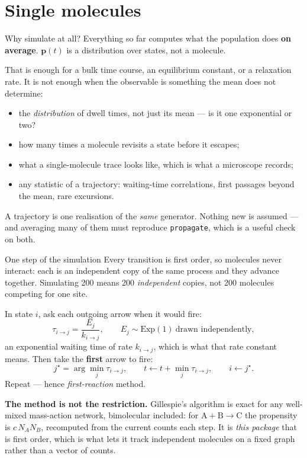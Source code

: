 \documentclass[10pt,aspectratio=169]{beamer}
\newcommand{\code}[1]{\texttt{\small #1}}
\begin{document}
\section[Single molecules]{Single molecules}

\begin{frame}{Why simulate at all?}
  Everything so far computes what the population does \textbf{on average}.
  $\bm{p}(t)$ is a distribution over states, not a molecule.

  That is enough for a bulk time course, an equilibrium constant, or a
  relaxation rate. It is not enough when the observable is something the
  mean does not determine:
  \begin{itemize}
    \item the \emph{distribution} of dwell times, not just its mean --- is
      it one exponential or two?
    \item how many times a molecule revisits a state before it escapes;
    \item what a single-molecule trace looks like, which is what a
      microscope records;
    \item any statistic of a trajectory: waiting-time correlations, first
      passages beyond the mean, rare excursions.
  \end{itemize}
  A trajectory is one realisation of the \emph{same} generator. Nothing new
  is assumed --- and averaging many of them must reproduce
  \code{propagate}, which is a useful check on both.
\end{frame}

\begin{frame}{One step of the simulation}
  Every transition is first order, so molecules never interact: each is an
  independent copy of the same process and they advance together. Simulating 200 means 200 \emph{independent} copies, not
  200 molecules competing for one site.

  In state $i$, ask each outgoing arrow when it would fire:
  \vspace{-0.3em}
  \[
    \tau_{i\to j} = \frac{E_j}{k_{i\to j}},
    \qquad E_j \sim \mathrm{Exp}(1)\ \text{drawn independently},
  \]
  an exponential waiting time of rate $k_{i\to j}$, which is what that
  rate constant means. Then take the \textbf{first} arrow to fire:
  \[
    j^\star = \arg\min_j \tau_{i\to j},
    \qquad
    t \leftarrow t + \min_j \tau_{i\to j},
    \qquad
    i \leftarrow j^\star .
  \]
  Repeat --- hence \emph{first-reaction} method.

  \smallskip
  \textbf{The method is not the restriction.} Gillespie's algorithm is exact
  for any well-mixed mass-action network, bimolecular included: for
  $\mathrm{A}+\mathrm{B}\to\mathrm{C}$ the propensity is $c\,N_A N_B$,
  recomputed from the current counts each step. It is \emph{this package}
  that is first order, which is what lets it track independent molecules on
  a fixed graph rather than a vector of counts.
\end{frame}
\end{document}
